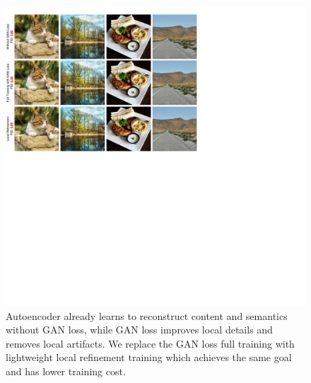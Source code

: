 \begin{figure}[t]
    \centering
    \includegraphics[width=0.95\linewidth]{figures/src/method_gan.pdf}
    \caption{Autoencoder already learns to reconstruct content and semantics without GAN loss, while GAN loss improves local details and removes local artifacts. We replace the GAN loss full training with lightweight local refinement training which achieves the same goal and has lower training cost.}
    \label{fig:method_gan}
\end{figure}